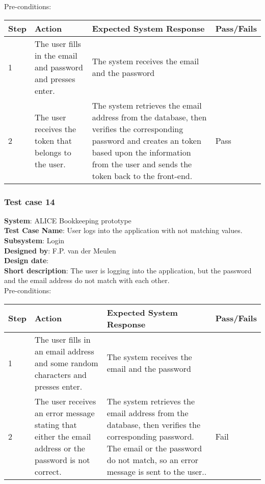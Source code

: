 Pre-conditions: \\

\begin{longtable}{ | p{0.8cm} | p{4.5cm} | p{6cm} | p{1.5cm} |}
\hline
Step & Action & Expected System Response & Pass/Fails  \\ \hline
1 & The user fills in the email and password and presses enter. & The system receives the email and the password &  \\ \hline
2 & The user receives the token that belongs to the user. & The system retrieves the email address from the database, then verifies the corresponding password and creates an token based upon the information from the user and sends the token back to the front-end. & Pass \\ \hline
\end{longtable}

\subsubsection{Test case 14}
\textbf{System}:  ALICE Bookkeeping prototype \\
\textbf{Test Case Name}:  User logs into the application with not matching values. \\
\textbf{Subsystem}:  Login \\
\textbf{Designed by}:  F.P. van der Meulen\\
\textbf{Design date}:  \\
\textbf{Short description}: The user is logging into the application, but the password and the email address do not match with each other. \\

Pre-conditions: \\

\begin{longtable}{ | p{0.8cm} | p{4.5cm} | p{6cm} | p{1.5cm} |}
\hline
Step & Action & Expected System Response & Pass/Fails  \\ \hline
1 & The user fills in an email address and some random characters and presses enter. & The system receives the email and the password &  \\ \hline
2 & The user receives an error message stating that either the email address or the password is not correct. & The system retrieves the email address from the database, then verifies the corresponding password. The email or the password do not match, so an error message is sent to the user.. & Fail \\ \hline
\end{longtable}
